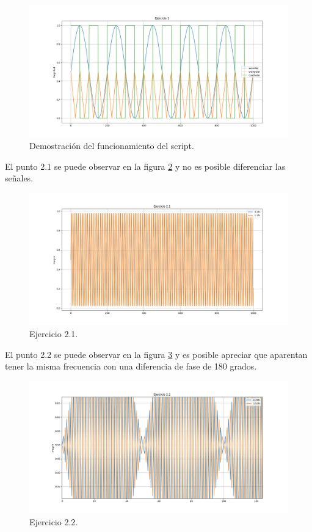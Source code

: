 \documentclass[
    11pt,
    spanish,
	a4paper
]{article}
\begin{document}
\begin{figure}[htbp]
	\centering
	\includegraphics[width=\textwidth]{../img/fig1.png}
	\caption{Demostración del funcionamiento del script.}
	\label{fig:demo}
\end{figure}

El punto 2.1 se puede observar en la figura \ref{fig:nodiff} y no es posible diferenciar las señales.

\begin{figure}[htbp]
	\centering
	\includegraphics[width=\textwidth]{../img/fig2.png}
	\caption{Ejercicio 2.1.}
	\label{fig:nodiff}
\end{figure}

El punto 2.2 se puede observar en la figura \ref{fig:fase} y es posible apreciar
que aparentan tener la misma frecuencia con una diferencia de fase de 180 grados.

\begin{figure}[htbp]
	\centering
	\includegraphics[width=\textwidth]{../img/fig3.png}
	\caption{Ejercicio 2.2.}
	\label{fig:fase}
\end{figure}
\end{document}
